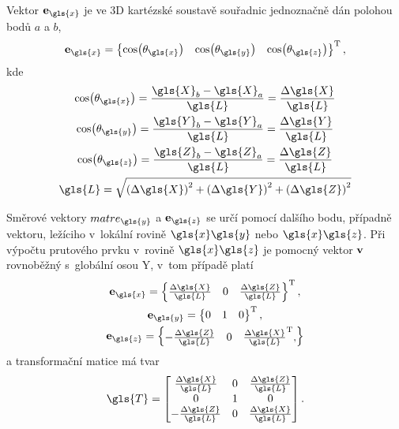 Vektor $\matr{e}_{\gls{x}}$ je ve 3D kartézské soustavě souřadnic jednoznačně dán polohou bodů $a$ a $b$,
\begin{equation}
    \matr{e}_{\gls{x}} = 
    \begin{Bmatrix}
        \cos({\theta_{\gls{x}}}) &
        \cos({\theta_{\gls{y}}}) &
        \cos({\theta_{\gls{z}}})
    \end{Bmatrix}^{\mathrm{T}},
\end{equation}
kde
\begin{equation}
    \begin{gathered}
        \cos({\theta_{\gls{x}}}) = \frac{\gls{X}_b - \gls{X}_a}{\gls{L}} = \frac{\Delta \gls{X}}{\gls{L}} \\
        \cos({\theta_{\gls{y}}}) = \frac{\gls{Y}_b - \gls{Y}_a}{\gls{L}} = \frac{\Delta \gls{Y}}{\gls{L}} \\
        \cos({\theta_{\gls{z}}}) = \frac{\gls{Z}_b - \gls{Z}_a}{\gls{L}} = \frac{\Delta \gls{Z}}{\gls{L}} \\
        \gls{L} = \sqrt{\left(\Delta \gls{X}\right)^2 + \left(\Delta \gls{Y}\right)^2 + \left(\Delta \gls{Z}\right)^2}
    \end{gathered}
\end{equation}

Směrové vektory $matr{e}_{\gls{y}}$ a $\matr{e}_{\gls{z}}$ se určí pomocí dalšího bodu, případně vektoru, ležíciho v~lokální rovině $\gls{x}\gls{y}$ nebo $\gls{x}\gls{z}$.
Při výpočtu prutového prvku v~rovině $\gls{x}\gls{z}$ je pomocný vektor $\mathbf{v}$ rovnoběžný s~globální osou \gls{Y}, v~tom případě platí
\begin{equation}
    \begin{gathered}
        \matr{e}_{\gls{x}}
        = 
        \begin{Bmatrix}
            \frac{\Delta \gls{X}}{\gls{L}} &
            0 &
            \frac{\Delta \gls{Z}}{\gls{L}}
        \end{Bmatrix}^{\mathrm{T}}, 
        \\
        \matr{e}_{\gls{y}} 
        = 
        \begin{Bmatrix}
            0 & 1 & 0\\
        \end{Bmatrix}^{\mathrm{T}},
        \\
        \matr{e}_{\gls{z}}
        =
        \begin{Bmatrix}
            - \frac{\Delta \gls{Z}}{\gls{L}} &
            0 &
            \frac{\Delta \gls{X}}{\gls{L}}^{\mathrm{T}},
        \end{Bmatrix}
    \end{gathered}
\end{equation}
a transformační matice má tvar
\begin{equation}
    \gls{T}
    =
    \begin{bmatrix}
        \frac{\Delta \gls{X}}{\gls{L}} & 0 & \frac{\Delta \gls{Z}}{\gls{L}} \\
        0 & 1 & 0 \\
        - \frac{\Delta \gls{Z}}{\gls{L}} &
        0 &
        \frac{\Delta \gls{X}}{\gls{L}}
    \end{bmatrix}.
\end{equation}

